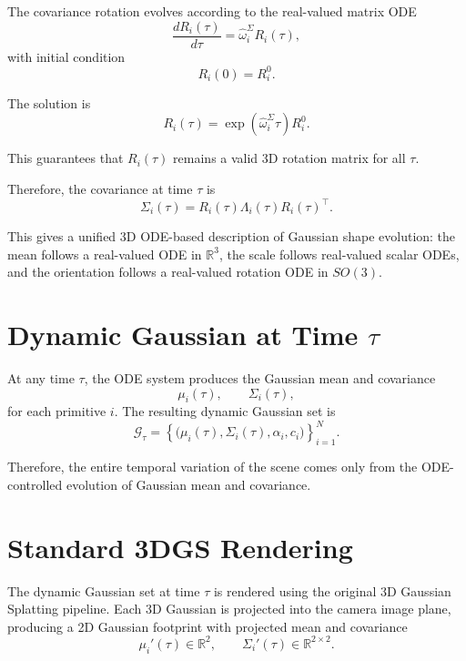 \documentclass[11pt]{article}
\begin{document}
The covariance rotation evolves according to the real-valued matrix ODE
\begin{equation}
\frac{dR_i(\tau)}{d\tau}
=
\widehat{\omega}_i^\Sigma R_i(\tau),
\end{equation}
with initial condition
\begin{equation}
R_i(0)=R_i^0.
\end{equation}

The solution is
\begin{equation}
R_i(\tau)
=
\exp\left(\widehat{\omega}_i^\Sigma \tau\right)R_i^0.
\end{equation}

This guarantees that $R_i(\tau)$ remains a valid 3D rotation matrix for all $\tau$.

Therefore, the covariance at time $\tau$ is
\begin{equation}
\Sigma_i(\tau)
=
R_i(\tau)
\Lambda_i(\tau)
R_i(\tau)^\top.
\end{equation}

This gives a unified 3D ODE-based description of Gaussian shape evolution: the mean follows a real-valued ODE in $\mathbb{R}^3$, the scale follows real-valued scalar ODEs, and the orientation follows a real-valued rotation ODE in $SO(3)$.

\section{Dynamic Gaussian at Time \texorpdfstring{$\tau$}{tau}}

At any time $\tau$, the ODE system produces the Gaussian mean and covariance
\begin{equation}
\mu_i(\tau),
\qquad
\Sigma_i(\tau),
\end{equation}
for each primitive $i$. The resulting dynamic Gaussian set is
\begin{equation}
\mathcal{G}_{\tau}
=
\left\{
\bigl(\mu_i(\tau),\Sigma_i(\tau),\alpha_i,c_i\bigr)
\right\}_{i=1}^N.
\end{equation}

Therefore, the entire temporal variation of the scene comes only from the ODE-controlled evolution of Gaussian mean and covariance.

\section{Standard 3DGS Rendering}

The dynamic Gaussian set at time $\tau$ is rendered using the original 3D Gaussian Splatting pipeline. Each 3D Gaussian is projected into the camera image plane, producing a 2D Gaussian footprint with projected mean and covariance
\begin{equation}
\mu_i'(\tau)\in\mathbb{R}^2,
\qquad
\Sigma_i'(\tau)\in\mathbb{R}^{2\times 2}.
\end{equation}
\end{document}
